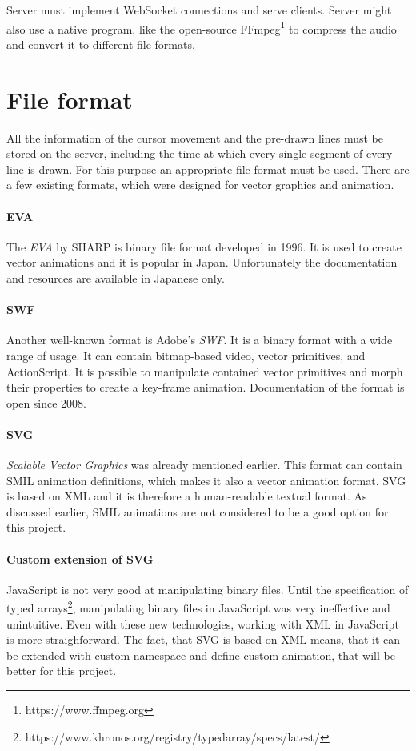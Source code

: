Server must implement WebSocket connections and serve clients. Server might also use a native program, like the open-source FFmpeg\footnote{https://www.ffmpeg.org} to compress the audio and convert it to different file formats.









\section{File format}
All the information of the cursor movement and the pre-drawn lines must be stored on the server, including the time at which every single segment of every line is drawn. For this purpose an appropriate file format must be used. There are a few existing formats, which were designed for vector graphics and animation.

\paragraph{EVA} The \textit{EVA} by SHARP\cite{eva_sharp} is binary file format developed in 1996. It is used to create vector animations and it is popular in Japan. Unfortunately the documentation and resources are available in Japanese only\cite{eva_wikipedia}.

\paragraph{SWF} Another well-known format is Adobe's \textit{SWF}. It is a binary format with a wide range of usage. It can contain bitmap-based video, vector primitives, and ActionScript\cite{swf_wiki}. It is possible to manipulate contained vector primitives and morph their properties to create a key-frame animation\cite{swf_doc}. Documentation of the format is open since 2008.

\paragraph{SVG} \textit{Scalable Vector Graphics} was already mentioned earlier. This format can contain SMIL animation definitions, which makes it also a vector animation format. SVG is based on XML and it is therefore a human-readable textual format. As discussed earlier, SMIL animations are not considered to be a good option for this project.

\paragraph{Custom extension of SVG} JavaScript is not very good at manipulating binary files. Until the specification of typed arrays\footnote{https://www.khronos.org/registry/typedarray/specs/latest/}, manipulating binary files in JavaScript was very ineffective and unintuitive. Even with these new technologies, working with XML in JavaScript is more straighforward. The fact, that SVG is based on XML means, that it can be extended with custom namespace and define custom animation, that will be better for this project.

